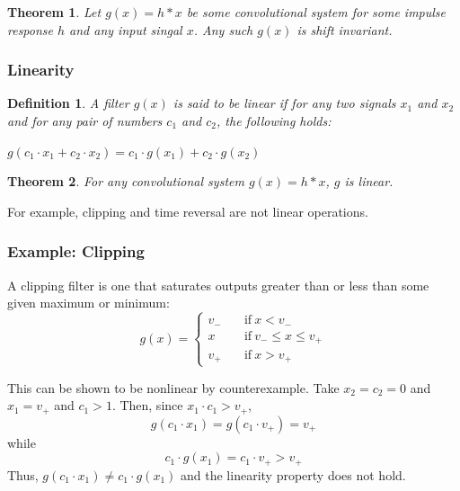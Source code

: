 \documentclass{article}
\newtheorem{definition}{Definition}
\newtheorem{theorem}{Theorem}
\begin{document}
\begin{theorem}
    Let $g(x) = h * x$ be some convolutional system for some impulse response $h$
    and any input singal $x$.  Any such $g(x)$ is shift invariant.
\end{theorem}


\subsubsection{Linearity}

\begin{definition}
    A filter $g(x)$ is said to be linear if for any two signals $x_1$ and $x_2$
    and for any pair of numbers $c_1$ and $c_2$, the following holds:

        $g(c_1 \cdot x_1 + c_2 \cdot x_2) = c_1 \cdot g(x_1) + c_2 \cdot g(x_2)$

\end{definition}

\begin{theorem}
    For any convolutional system $g(x) = h * x$, $g$ is linear.
\end{theorem}


For example, clipping and time reversal are not linear operations.

\subsubsection{Example: Clipping}

A clipping filter is one that saturates outputs greater than or less than some
given maximum or minimum:
\begin{equation}
    g(x) = \left\{
        \begin{array}{ll}
            v_- & \quad \text{if} \ x < v_- \\
            x & \quad \text{if} \ v_- \leq x \leq v_+ \\
            v_+ & \quad \text{if} \ x > v_+
        \end{array}
    \right.
\end{equation}

This can be shown to be nonlinear by counterexample. Take $x_2 = c_2 = 0$ and
$x_1 = v_+$ and $c_1 > 1$. Then, since $x_1 \cdot c_1 > v_+$,
\begin{equation}
g(c_1 \cdot x_1) = g(c_1 \cdot v_+) = v_+
\end{equation}
while 
\begin{equation}
    c_1 \cdot g(x_1) = c_1 \cdot v_+ > v_+
\end{equation}
Thus, $g(c_1 \cdot x_1) \neq c_1 \cdot g(x_1)$ and the linearity property
does not hold.
\end{document}
